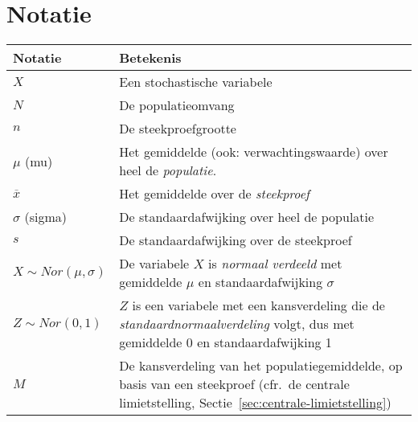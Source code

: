 \chapter{Notatie}
\label{app:notatie}

\begin{table}
  \centering
  \begin{tabular}{p{}p{}}
    \toprule
    \textbf{Notatie} & \textbf{Betekenis} \\
    \midrule
    $X$                       & Een stochastische variabele \\
    $N$                       & De populatieomvang \\
    $n$                       & De steekproefgrootte \\
    $\mu$ (mu)                & Het gemiddelde (ook: verwachtingswaarde) over heel de \emph{populatie}. \\
    $\overline{x}$            & Het gemiddelde over de \emph{steekproef} \\
    $\sigma$ (sigma)          & De standaardafwijking over heel de populatie \\
    $s$                       & De standaardafwijking over de steekproef \\
    $X \sim Nor(\mu, \sigma)$ & De variabele $X$ is \emph{normaal verdeeld} met gemiddelde $\mu$ en standaardafwijking $\sigma$ \\
    $Z \sim Nor(0, 1)$        & $Z$ is een variabele met een kansverdeling die de \emph{standaardnormaalverdeling} volgt, dus met gemiddelde 0 en standaardafwijking 1 \\
    $M$                       & De kansverdeling van het populatiegemiddelde, op basis van een steekproef (cfr.~de centrale limietstelling, Sectie~\ref{sec:centrale-limietstelling}) \\

    \bottomrule
  \end{tabular}
\end{table}
